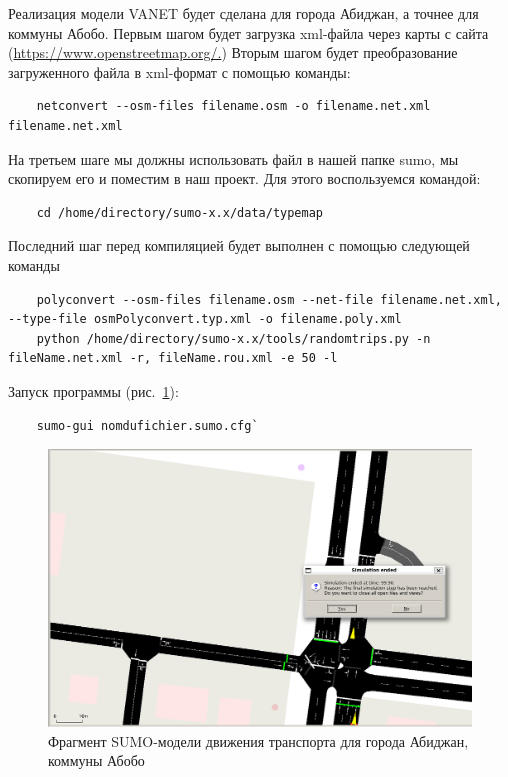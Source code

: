 Реализация модели VANET будет сделана для города Абиджан, а точнее для
коммуны Абобо.  Первым шагом будет загрузка xml-файла через карты с
сайта (\url{https://www.openstreetmap.org/.})  Вторым шагом будет
преобразование загруженного файла в xml-формат с помощью команды:
\begin{verbatim}
    netconvert --osm-files filename.osm -o filename.net.xml filename.net.xml
\end{verbatim}

На третьем шаге мы должны использовать файл в нашей папке sumo, мы скопируем
его и поместим в наш проект. Для этого воспользуемся командой:
\begin{verbatim}
    cd /home/directory/sumo-x.x/data/typemap
\end{verbatim}

Последний шаг перед компиляцией будет выполнен с помощью следующей команды
\begin{verbatim}
    polyconvert --osm-files filename.osm --net-file filename.net.xml, --type-file osmPolyconvert.typ.xml -o filename.poly.xml
    python /home/directory/sumo-x.x/tools/randomtrips.py -n fileName.net.xml -r, fileName.rou.xml -e 50 -l
\end{verbatim}

Запуск программы (рис.~\ref{fig:1.3}):
\begin{verbatim}
    sumo-gui nomdufichier.sumo.cfg`
\end{verbatim}

\begin{figure}[!h]
  \centering
  \includegraphics[width=0.9\linewidth]{image/08.PNG}
  \caption{Фрагмент SUMO-модели движения транспорта для города Абиджан, коммуны Абобо}
  \label{fig:1.3}
\end{figure}



